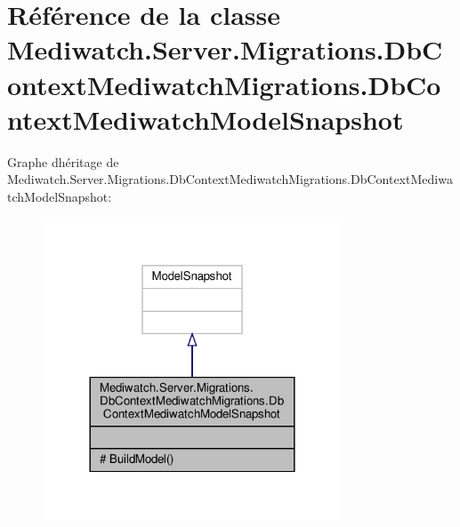 \hypertarget{class_mediwatch_1_1_server_1_1_migrations_1_1_db_context_mediwatch_migrations_1_1_db_context_mediwatch_model_snapshot}{}\section{Référence de la classe Mediwatch.\+Server.\+Migrations.\+Db\+Context\+Mediwatch\+Migrations.\+Db\+Context\+Mediwatch\+Model\+Snapshot}
\label{class_mediwatch_1_1_server_1_1_migrations_1_1_db_context_mediwatch_migrations_1_1_db_context_mediwatch_model_snapshot}


Graphe d\textquotesingle{}héritage de Mediwatch.\+Server.\+Migrations.\+Db\+Context\+Mediwatch\+Migrations.\+Db\+Context\+Mediwatch\+Model\+Snapshot\+:\nopagebreak
\begin{figure}[H]
\begin{center}
\leavevmode
\includegraphics[width=252pt]{class_mediwatch_1_1_server_1_1_migrations_1_1_db_context_mediwatch_migrations_1_1_db_context_mede4265d04ea6c9106ce2ecf4620b99a3e}
\end{center}
\end{figure}


